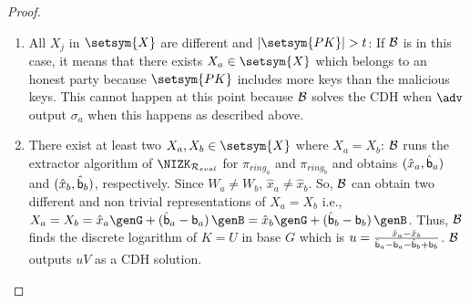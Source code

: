 \begin{proof}
\begin{enumerate}
		\item All $ X_j $ in $ \setsym{X} $ are different and $ |\setsym{PK}| > t $: If $ \mathcal{B} $ is in this case, it means that there exists $ X_a \in \setsym{X} $ which belongs to an honest party because $ \setsym{PK} $ includes more keys than the malicious keys. This cannot happen at this point because $ \mathcal{B} $ solves the CDH when $ \adv $ output $ \sigma_a $ when this happens as described above. 
		\item  There exist at least two $ X_a,X_b \in \setsym{X} $ where $ X_a = X_b $: $ \mathcal{B} $ runs the extractor algorithm of $ \NIZK_{\rcom} $ for $ \pi_{ring_a} $ and $ \pi_{ring_b} $ and obtains $(\hat{x}_a,\hat{\mathsf{b}}_a )$ and $(\hat{x}_b,\hat{\mathsf{b}}_b )$, respectively. Since $ W_a \neq W_b $, $ \hat{x}_a \neq \hat{x}_b $. So, $ \mathcal{B} $ can obtain two different and non trivial representations of $ X_a = X_b $ i.e., $ X_a = X_b = \hat{x}_a\genG + (\hat{\openpk}_a - \openpk_a) \, \genB = \hat{x}_b\genG + (\hat{\openpk}_b - \openpk_b) \, \genB $. Thus, $ \mathcal{B} $ finds the discrete logarithm of $ K = U $ in base $ G $ which is $ u = \frac{\hat{x}_a - \hat{x}_b}{\hat{\mathsf{b}}_a -\mathsf{b}_a -\hat{\mathsf{b}}_b + \mathsf{b}_b} $. $ \mathcal{B} $ outputs $ uV $ as a CDH solution.
	\end{enumerate}
	

\end{proof}
